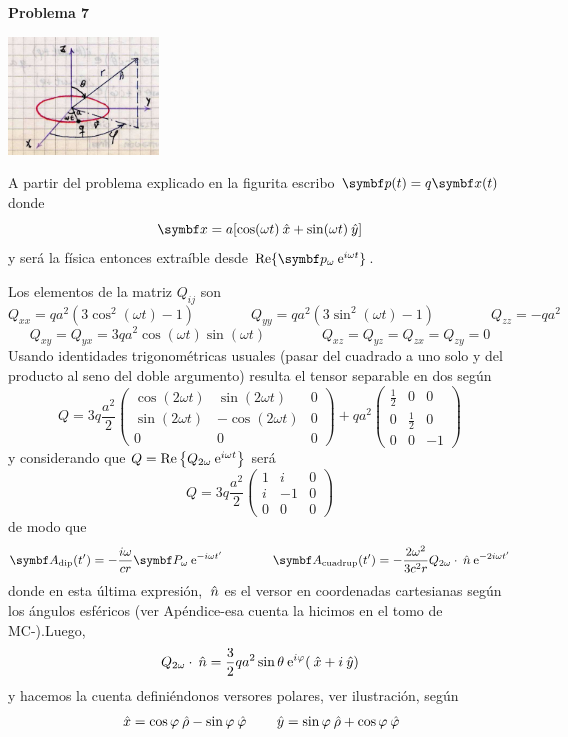 \documentclass[10pt,oneside]{CBFT_book}
\begin{document}
\begin{ejemplo}{\bf Problema 7}
 
\includegraphics[width=0.3\textwidth]{images/fig_ft1_anillo_radiador.jpg} 
 
A partir del problema explicado en la figurita escribo $\vb{p}(t) = q \vbx(t)$ donde
\[
	\vbx = a [ \cos(\omega t)\xver + \sin(\omega t) \yver ]
\]
y será la física entonces extraíble desde $\text{Re}\{ \vb{p}_\omega \euler^{i\omega t}\}$.

Los elementos de la matriz $Q_{ij}$ son
\[
	Q_{xx} = q a^2 ( 3 \cos^2(\omega t) - 1 ) \qquad \qquad 
	Q_{yy} = q a^2 ( 3 \sin^2(\omega t) - 1 ) \qquad \qquad 
	Q_{zz} = - q a^2
\]
\[
	Q_{xy} = Q_{yx} = 3 q a^2 \cos(\omega t) \sin(\omega t) \qquad \qquad 
	Q_{xz} = Q_{yz} = Q_{zx} = Q_{zy} = 0
\]
Usando identidades trigonométricas usuales (pasar del cuadrado a uno solo y del producto
al seno del doble argumento) resulta el tensor separable en dos según
\[
	Q = 3 q \frac{a^2}{2} \begin{pmatrix}
	\cos( 2 \omega t ) & \sin( 2 \omega t ) &  0 \\
	\sin( 2 \omega t ) & -\cos( 2 \omega t ) &  0 \\
	0		&	0 	&	0 
	\end{pmatrix}
	+ q a^2
	\begin{pmatrix}
	\frac{1}{2} & 0 &  0 \\
	0 & \frac{1}{2} &  0 \\
	0		&	0 	&	-1
	\end{pmatrix}
\]
y considerando que $ Q = \text{Re}\left\{ Q_{2\omega}\:\mathrm{e}^{ i \omega t } \right\}$ será
\[
	Q = 3 q \frac{a^2}{2} \begin{pmatrix}
	1 &  i &  0 \\
	i & -1 &  0 \\
	0 &  0 &  0 
	\end{pmatrix}
\]
de modo que 
\[
	\vb{A}_\text{dip}(t') = - \frac{i\omega}{cr}\vb{P}_\omega \euler^{-i\omega t'}
	\qquad \qquad 
	\vb{A}_\text{cuadrup}(t') = - \frac{2 \omega^2}{3c^2r} Q_{2\omega}\cdot\nver \euler^{-2i\omega t'}
\]
donde en esta última expresión, $\:\hat{n}$ es el versor en coordenadas cartesianas según los ángulos
esféricos (ver Apéndice-esa cuenta la hicimos en el tomo de MC-).Luego,
\[
	Q_{2\omega}\cdot\:\hat{n} = \frac{3}{2} q a^2 \sin\theta \:\mathrm{e}^{i\varphi}(\:\hat{x} + i \:\hat{y} )
\]
y hacemos la cuenta definiéndonos versores polares, ver ilustración, según
\[
	\:\hat{x} = \cos\varphi \:\hat{\rho} - \sin\varphi \:\hat{\varphi}
	\qquad 
	\:\hat{y} = \sin\varphi \:\hat{\rho} + \cos\varphi \:\hat{\varphi}
\]


\end{ejemplo}
\end{document}
